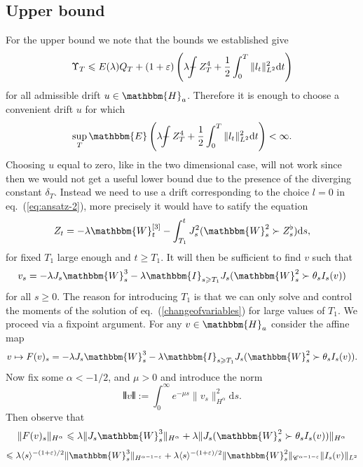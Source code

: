 \documentclass[11pt, oneside]{article}   	%
\newcommand{\assign}{:=}
\newcommand{\mathd}{\mathrm{d}}
\def\Xint#1{\mathchoice
{\XXint\displaystyle\textstyle{#1}}%
{\XXint\textstyle\scriptstyle{#1}}%
{\XXint\scriptstyle\scriptscriptstyle{#1}}%
{\XXint\scriptscriptstyle\scriptscriptstyle{#1}}%
\!\int}
\def\XXint#1#2#3{{\setbox0=\hbox{$#1{#2#3}{\int}$ }
\vcenter{\hbox{$#2#3$ }}\kern-.6\wd0}}
\def\dashint{\Xint-}
\newcommand{\bint}{\dashint}
\newcommand{\VV}{\mathscr{C}}
\begin{document}
\subsection{Upper bound}

For the upper bound we note that the bounds we established give
\[ \Upsilon_T \leqslant E (\lambda) Q_T + (1 + \varepsilon) \left( \lambda
   \bint  Z_T^4 + \frac{1}{2} \int_0^T \| l_t \|^2_{L^2} \mathd t \right)
\]
for all admissible drift $u \in \mathbbm{H}_a$. Therefore it is enough to
choose a convenient drift $u$ for which
\begin{equation}
  \sup_T \mathbbm{E} \left( \lambda \bint  Z_T^4 + \frac{1}{2} \int_0^T \|
  l_t \|^2_{L^2} \mathd t \right) < \infty . \label{eq:upper-bound-constraint}
\end{equation}
Choosing $u$ equal to zero, like in the two dimensional case, will not work
since then we would not get a useful lower bound due to the presence of the
diverging constant $\delta_T .$ Instead we need to use a drift corresponding
to the choice $l = 0$ in eq.~(\ref{eq:ansatz-2}), more precisely it would have
to satify the equation
\begin{equation}
  Z_t = - \lambda \mathbbm{W}_t^{[3]} - \int^t_{T_1} J^2_s (\mathbbm{W}^2_s
  \succ Z^{\flat}_s) \mathd s, \label{eq:z-upper-bound}
\end{equation}
for fixed $T_1$ large enough and $t \geqslant T_1$. It will then be sufficient
to find $v$ such that
\begin{equation}
  v_s = - \lambda J_s \mathbbm{W}_s^3 - \lambda \mathbbm{I}_{s \geqslant T_1}
  J_s (\mathbbm{W}^2_s \succ \theta_s I_s (v))  \label{changeofvariables}
\end{equation}
for all $s \geqslant 0$. The reason for introducing $T_1$ is that we can only
solve and control the moments of the solution of eq.~(\ref{changeofvariables})
for large values of $T_1$. We proceed via a fixpoint argument. For any $v \in
\mathbbm{H}_a$ consider the affine map
\[ v \mapsto F (v)_s = - \lambda J_s \mathbbm{W}_s^3 - \lambda \mathbbm{I}_{s
   \geqslant T_1} J_s (\mathbbm{W}^2_s \succ \theta_s I_s (v)) . \]
Now fix some $\alpha < - 1 / 2$, and $\mu > 0$ and introduce the norm
\[ \interleave v \interleave \assign \int_0^{\infty} e^{- \mu s} \| v_s
   \|_{H^{\alpha}}^2 \mathd s. \]
Then observe that
\[ \| F (v)_s \|_{H^{\alpha}} \leqslant \lambda \| J_s \mathbbm{W}_s^3
   \|_{H^{\alpha}} + \lambda \| J_s (\mathbbm{W}^2_s \succ \theta_s I_s (v))
   \|_{H^{\alpha}} \]
\[ \leqslant \lambda \langle s \rangle^{- (1 + \varepsilon) / 2} \|
   \mathbbm{W}_s^3 \|_{H^{\alpha - 1 - \varepsilon}} + \lambda \langle s
   \rangle^{- (1 + \varepsilon) / 2} \| \mathbbm{W}^2_s \|_{\VV^{\alpha - 1 -
   \varepsilon}} \| I_s (v) \|_{L^2} \]
\end{document}
